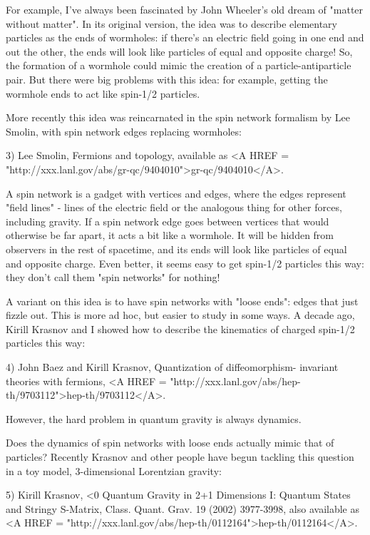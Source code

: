 For example, I've always been fascinated by John Wheeler's old dream of
"matter without matter".  In its original version, the idea was to 
describe elementary particles as the ends of wormholes: if there's
an electric field going in one end and out the other, the ends will 
look like particles of equal and opposite charge!  So, the formation
of a wormhole could mimic the creation of a particle-antiparticle
pair.  But there were big problems with this idea: for example, 
getting the wormhole ends to act like spin-1/2 particles.

More recently this idea was reincarnated in the spin network formalism 
by Lee Smolin, with spin network edges replacing wormholes:

3) Lee Smolin, Fermions and topology, available as 
<A HREF = "http://xxx.lanl.gov/abs/gr-qc/9404010">gr-qc/9404010</A>.

A spin network is a gadget with vertices and edges, where the edges
represent "field lines" - lines of the electric field or the analogous
thing for other forces, including gravity.  If a spin network edge goes 
between vertices that would otherwise be far apart, it acts a bit 
like a wormhole.  It will be hidden from observers in the rest of 
spacetime, and its ends will look like particles of equal and opposite 
charge.  Even better, it seems easy to get spin-1/2 particles this way:
they don't call them "spin networks" for nothing!    

A variant on this idea is to have spin networks with "loose ends":
edges that just fizzle out.  This is more ad hoc, but easier to study
in some ways.   A decade ago, Kirill Krasnov and I showed how to describe 
the kinematics of charged spin-1/2 particles this way:

4) John Baez and Kirill Krasnov, Quantization of diffeomorphism-
invariant theories with fermions, <A HREF = "http://xxx.lanl.gov/abs/hep-th/9703112">hep-th/9703112</A>.

However, the hard problem in quantum gravity is always dynamics. 
 
Does the dynamics of spin networks with loose ends actually mimic that
of particles?  Recently Krasnov and other people have begun tackling 
this question in a toy model, 3-dimensional Lorentzian gravity:

5) Kirill Krasnov, \Lambda <0 Quantum Gravity in 2+1 Dimensions I: 
Quantum States and Stringy S-Matrix, Class. Quant. Grav. 19 (2002) 
3977-3998, also available as <A HREF = "http://xxx.lanl.gov/abs/hep-th/0112164">hep-th/0112164</A>.

